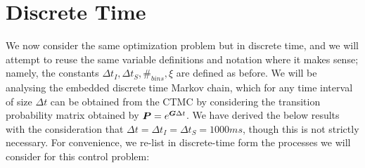 \section{Discrete Time}
We now consider the same optimization problem but in discrete time, and we will attempt to reuse the same variable definitions and notation where it makes sense; namely, the constants $\Delta {t_{I}}, \Delta {t_{S}}, \#_{bins}, \xi$ are defined as before. We will be analysing the embedded discrete time Markov chain, which for any time interval of size $
\Delta t$ can be obtained from the CTMC by considering the transition probability matrix obtained by $\boldsymbol{P} = e^{\boldsymbol{G}\Delta t}$. We have derived the below results with the consideration that $\Delta t = \Delta {t_{I}} = \Delta {t_{S}} = 1000ms$, though this is not strictly necessary. For convenience, we re-list in discrete-time form the processes we will consider for this control problem:

